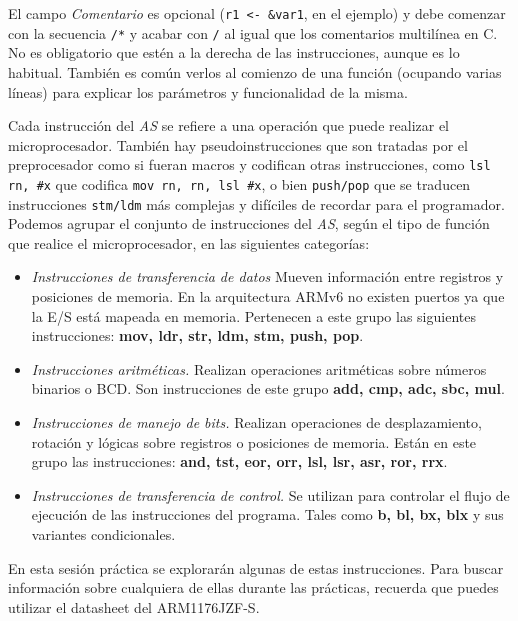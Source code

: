 El campo \textit{Comentario} es opcional ({\tt r1 <- \&var1}, en el ejemplo)
y debe comenzar con la secuencia {\tt /*} y acabar con {\tt */} al igual
que los comentarios multilínea en C. No es obligatorio que estén a la
derecha de las instrucciones, aunque es lo habitual. También es común
verlos al comienzo de una función (ocupando varias líneas) para explicar
los parámetros y funcionalidad de la misma.

Cada instrucción del {\it AS} se refiere a una operación que puede
realizar el microprocesador. También hay pseudoinstrucciones que son
tratadas por el preprocesador como si fueran macros y codifican otras
instrucciones, como {\tt lsl rn, \#x} que codifica {\tt mov rn, rn, lsl \#x},
o bien {\tt push/pop} que se traducen instrucciones {\tt stm/ldm} más complejas
y difíciles de recordar para el programador. Podemos agrupar el conjunto de
instrucciones del {\it AS}, según el tipo de función que realice el
microprocesador, en las siguientes categorías:

\begin{itemize}

       \item \textit{Instrucciones de transferencia de datos}
Mueven información entre registros y posiciones de memoria. En la
arquitectura ARMv6 no existen puertos ya que la E/S está mapeada
en memoria. Pertenecen a este grupo las siguientes instrucciones:
\textbf{mov, ldr, str, ldm, stm, push, pop}.

       \item \textit{Instrucciones aritméticas.}  Realizan operaciones
aritméticas sobre números binarios o BCD.  Son instrucciones de este
grupo \textbf{add, cmp, adc, sbc, mul}.

     \item \textit{Instrucciones de manejo de bits.}  Realizan
operaciones de desplazamiento, rotación y lógicas sobre registros o
posiciones de memoria. Están en este grupo las instrucciones:\textbf{
and, tst, eor, orr, lsl, lsr, asr, ror, rrx}.

     \item \textit{Instrucciones de transferencia de control.}  Se
utilizan para controlar el flujo de ejecución de las instrucciones
del programa. Tales como \textbf{b, bl, bx, blx} y sus variantes
condicionales.

\end{itemize}

En esta sesión práctica se explorarán algunas de estas instrucciones.
Para buscar información sobre cualquiera de ellas durante las prácticas,
recuerda que puedes utilizar el datasheet del ARM1176JZF-S.

